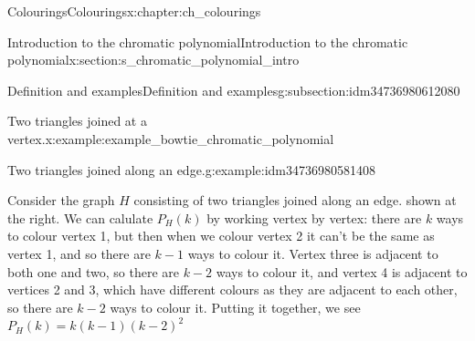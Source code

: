 \documentclass[oneside,10pt,]{book}
\numberwithin{equation}{section}
\begin{document}
\begin{chapterptx}{Colourings}{}{Colourings}{}{}{x:chapter:ch_colourings}
\begin{sectionptx}{Introduction to the chromatic polynomial}{}{Introduction to the chromatic polynomial}{}{}{x:section:s_chromatic_polynomial_intro}
\begin{subsectionptx}{Definition and examples}{}{Definition and examples}{}{}{g:subsection:idm34736980612080}
\begin{example}{Two triangles joined at a vertex.}{x:example:example_bowtie_chromatic_polynomial}
\begin{sidebyside}{2}{0.025}{0.025}{0.05}
\begin{sbspanel}{0.3}
{\begin{tikzpicture}[scale=2]
\end{tikzpicture}
}%
\end{sbspanel}%
\end{sidebyside}%
\end{example}
\begin{example}{Two triangles joined along an edge.}{g:example:idm34736980581408}%
\begin{sidebyside}{2}{0.025}{0.025}{0.05}%
\begin{sbspanel}{0.6}%
Consider the graph \(H\) consisting of two triangles joined along an edge. shown at the right.  We can calulate \(P_H(k)\) by working vertex by vertex: there are \(k\) ways to colour vertex 1, but then when we colour vertex 2 it can't be the same as vertex 1, and so there are \(k-1\) ways to colour it.  Vertex three is adjacent to both one and two, so there are \(k-2\) ways to colour it, and vertex 4 is adjacent to vertices 2 and 3, which have different colours as they are adjacent to each other, so there are \(k-2\) ways to colour it.  Putting it together, we see \(P_H(k)=k(k-1)(k-2)^2\)%
\end{sbspanel}%
\begin{sbspanel}{0.3}%
\end{sbspanel}
\end{sidebyside}
\end{example}
\end{subsectionptx}
\end{sectionptx}
\end{chapterptx}
\end{document}
